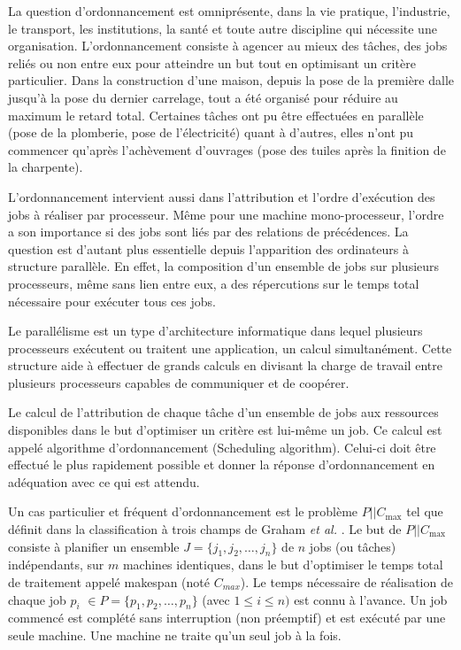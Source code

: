 \documentclass[a4paper,12pt]{report}
\theoremstyle{plain}				%
\theoremstyle{definition}				%
\newcommand\problemGrahamP{$P||C_{\max}$\xspace}
\newcommand{\jb}[1]{\todo[author=JB,color=orange,inline]{#1}}
\begin{document}
La question d’ordonnancement est omniprésente, dans la vie pratique, l'industrie, le transport, 
  les institutions, la santé et toute autre discipline qui nécessite une organisation.
  L'ordonnancement consiste à agencer au mieux des tâches, des jobs reliés ou non entre eux 
  pour atteindre un but tout en optimisant un critère particulier. 
Dans la construction d'une maison, depuis la pose de la première dalle jusqu'à la pose du dernier carrelage, 
  tout a été organisé pour réduire au maximum le retard total. 
  Certaines tâches ont pu être effectuées en parallèle (pose de la plomberie, pose de l'électricité)  
  quant à d'autres, elles n'ont pu commencer qu'après l'achèvement d'ouvrages 
  (pose des tuiles après la finition de la charpente). 

L’ordonnancement intervient aussi dans l'attribution et l'ordre d’exécution des jobs à réaliser par processeur. 
Même pour une machine mono-processeur, l'ordre a son importance si des jobs sont liés par des relations de précédences. 
La question est d'autant plus essentielle depuis l'apparition des ordinateurs à structure parallèle.
En effet, la composition d'un ensemble de jobs sur plusieurs processeurs, même sans lien entre eux, a des répercutions sur le temps total nécessaire pour exécuter tous ces jobs. 

Le parallélisme est un type d'architecture informatique dans lequel plusieurs processeurs exécutent 
  ou traitent une application, un calcul simultanément. 
Cette structure aide à effectuer de grands calculs en divisant la charge de travail entre plusieurs 
  processeurs capables de communiquer et de coopérer.     

Le calcul de l'attribution de chaque tâche d'un ensemble de jobs aux ressources disponibles dans le but d'optimiser un critère est lui-même un job.  \jb{Je ne comprends pas la fin de la phrase précédente}
Ce calcul est appelé algorithme d'ordonnancement (Scheduling algorithm). 
Celui-ci doit être effectué le plus rapidement possible et donner la réponse d'ordonnancement en 
  adéquation avec ce qui est attendu.


Un cas particulier et fréquent d'ordonnancement est le problème \problemGrahamP tel que définit 
  dans la classification à trois champs de Graham \emph{et al.} \cite{graham1979optimization}. 
Le but de \problemGrahamP consiste à planifier un ensemble $J=\{j_1, j_2, \ldots, j_n\}$ de 
  $n$ jobs (ou tâches) indépendants, 
  sur $m$ machines identiques,  
  dans le but d'optimiser le temps total de traitement appelé makespan (noté $C_{max}$).
Le temps nécessaire de réalisation de chaque job $p_i$ $\in P=\{p_1, p_2, \ldots, p_n\}$  
  (avec $1 \leq i \leq n)$ est connu à l'avance. 
Un job commencé est complété sans interruption (non préemptif) 
  et est exécuté par une seule machine. 
Une machine ne traite qu'un seul job à la fois. 
\end{document}
